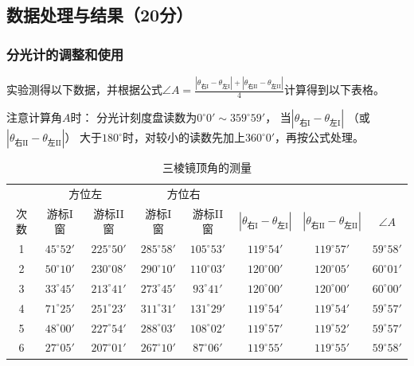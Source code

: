 \documentclass[10pt,a4paper]{ctexart} %
\begin{document}
  \subsection{数据处理与结果（20分）}  
  
    \subsubsection{分光计的调整和使用}
    实验测得以下数据，并根据公式$
    \angle A =
    \frac{
      |\theta_{\mbox{右}\mathrm{I}}-\theta_{\mbox{左}\mathrm{I}}|
      +
      |\theta_{\mbox{右}\mathrm{II}}-\theta_{\mbox{左}\mathrm{II}}|
    }{4}
    $计算得到以下表格。
    
    注意计算角$A$时：
    分光计刻度盘读数为$0^\circ 0' \sim 359^\circ 59'$，
    当$|\theta_{\mbox{右}\mathrm{I}}-\theta_{\mbox{左}\mathrm{I}}|$
    （或$|\theta_{\mbox{右}\mathrm{II}}-\theta_{\mbox{左}\mathrm{II}}|$）
    大于$180^\circ$时，对较小的读数先加上$360^\circ 0'$，再按公式处理。

    \begin{table}[H]
      \centering
      \caption{三棱镜顶角的测量}
      \begin{tabular}{cccccccc}
        \toprule
          & \multicolumn{2}{c}{方位左} & \multicolumn{2}{c}{方位右} & & & \\
        次数 & 游标I窗 & 游标II窗 & 游标I窗 & 游标II窗 
          & $|\theta_{\mbox{右}\mathrm{I}}-\theta_{\mbox{左}\mathrm{I}}|$ 
          & $|\theta_{\mbox{右}\mathrm{II}}-\theta_{\mbox{左}\mathrm{II}}|$ & $\angle A$ \\
        \midrule
        1 & $45^\circ52'$  & $225^\circ50'$ & $285^\circ58'$ & $105^\circ53'$
          & $119^\circ54'$ & $119^\circ57'$ & $59^\circ58'$ \\
        2 & $50^\circ10'$ & $230^\circ08'$ & $290^\circ10'$ & $110^\circ03'$
          & $120^\circ00'$ & $120^\circ05'$ & $60^\circ01'$ \\
        3 & $33^\circ45'$ & $213^\circ41'$ & $273^\circ45'$ & $93^\circ41'$
          & $120^\circ00'$ & $120^\circ00'$ & $60^\circ00'$ \\
        4 & $71^\circ25'$ & $251^\circ23'$ & $311^\circ31'$ & $131^\circ29'$
          & $119^\circ54'$ & $119^\circ54'$ & $59^\circ57'$ \\
        5 & $48^\circ00'$ & $227^\circ54'$ & $288^\circ03'$ & $108^\circ02'$
          & $119^\circ57'$ & $119^\circ52'$ & $59^\circ57'$ \\
        6 & $27^\circ05'$ & $207^\circ01'$ & $267^\circ10'$ & $87^\circ06'$
          & $119^\circ55'$ & $119^\circ55'$ & $59^\circ58'$ \\
        \bottomrule
      \end{tabular}
    \end{table}
\end{document}
